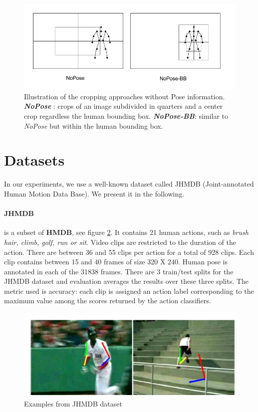 \documentclass[10pt,twocolumn,letterpaper]{article}
\begin{document}
\begin{figure}
	\begin{center}
		\includegraphics[width=1.0\linewidth]{nopose}
	\end{center}
	\caption{Illustration of the cropping approaches without Pose information. \textbf{\textit{NoPose}} : crops of an image subdivided in quarters and a center crop regardless the human bounding box. \textbf{\textit{NoPose-BB}}:  similar to \textit{NoPose} but within the human bounding box.}
	\label{fig:nopse}
\end{figure}
\section{Datasets}
\label{dataset}
In our experiments, we use a well-known dataset called JHMDB (Joint-annotated Human Motion Data Base)\cite{jhuang2013towards}. We present it in the following.
\paragraph{JHMDB}is a subset of \textbf{HMDB}\cite{kuehne2011hmdb}, see figure \ref{fig:JHMDB}. It contains 21 human actions, such as \textit{brush hair, climb, golf, run or sit}. Video clips are restricted to the duration of the action. There are between 36 and 55 clips per action
for a total of 928 clips. Each clip contains between 15 and
40 frames of size 320 X 240. Human pose is annotated in each of the 31838 frames. There are 3 train/test splits for the JHMDB dataset and evaluation averages the results over these three splits. The metric used is accuracy: each clip
is assigned an action label corresponding to the maximum value among the scores returned by the action classifiers.

\begin{figure}
	\begin{center}
		\includegraphics[width=1.0\linewidth]{JHMDB}
	\end{center}
	\caption{Examples from JHMDB dataset}
	\label{fig:JHMDB}
\end{figure}
\end{document}

